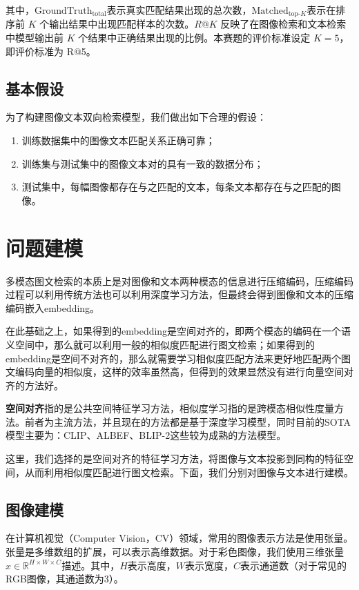 \documentclass[a4paper]{zreport}
\begin{document}
其中，$\mathrm{GroundTruth}_{\text{total}}$表示真实匹配结果出现的总次数，$\mathrm{Matched}_{\text{top-}K}$表示在排序前 $K$ 个输出结果中出现匹配样本的次数。$R@K$ 反映了在图像检索和文本检索中模型输出前 $K$ 个结果中正确结果出现的比例。本赛题的评价标准设定 $K=5$，即评价标准为 R@5。

\subsection{基本假设}

为了构建图像文本双向检索模型，我们做出如下合理的假设：

\begin{enumerate}
\item 训练数据集中的图像文本匹配关系正确可靠；
\item 训练集与测试集中的图像文本对的具有一致的数据分布；
\item 测试集中，每幅图像都存在与之匹配的文本，每条文本都存在与之匹配的图像。
\end{enumerate}

\newpage

\section{问题建模}

多模态图文检索的本质上是对图像和文本两种模态的信息进行压缩编码，压缩编码过程可以利用传统方法也可以利用深度学习方法，但最终会得到图像和文本的压缩编码嵌入embedding。

在此基础之上，如果得到的embedding是空间对齐的，即两个模态的编码在一个语义空间中，那么就可以利用一般的相似度匹配进行图文检索；如果得到的embedding是空间不对齐的，那么就需要学习相似度匹配方法来更好地匹配两个图文编码向量的相似度，这样的效率虽然高，但得到的效果显然没有进行向量空间对齐的方法好。

\textbf{空间对齐}指的是公共空间特征学习方法，相似度学习指的是跨模态相似性度量方法。前者为主流方法，并且现在的方法都是基于深度学习模型，同时目前的SOTA模型主要为：CLIP、ALBEF、BLIP-2这些较为成熟的方法模型。

这里，我们选择的是空间对齐的特征学习方法，将图像与文本投影到同构的特征空间，从而利用相似度匹配进行图文检索。下面，我们分别对图像与文本进行建模。

\subsection{图像建模}

在计算机视觉（Computer Vision，CV）领域，常用的图像表示方法是使用张量。张量是多维数组的扩展，可以表示高维数据。对于彩色图像，我们使用三维张量$x \in \mathbb{R}^{H \times W \times C}$描述。其中，$H$表示高度，$W$表示宽度，$C$表示通道数（对于常见的RGB图像，其通道数为3）。
\end{document}
